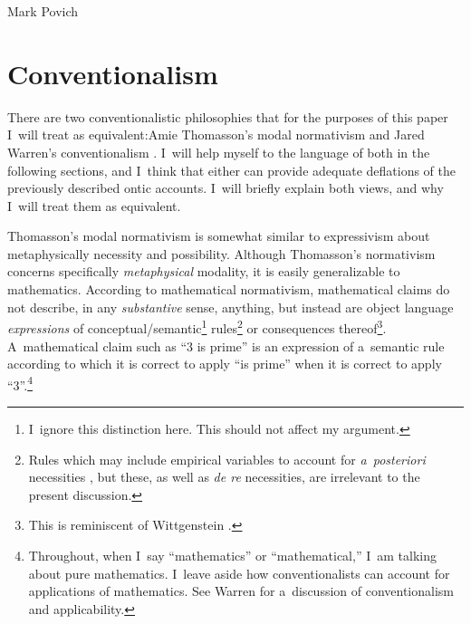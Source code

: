 \begin{artengenv}{Mark Povich}
\section{Conventionalism}
There are two conventionalistic philosophies that for the purposes of this paper I~will treat as equivalent:Amie Thomasson's
\parencites*[][]{thomasson_norms_2020}[][]{priest_note_2021} %
 modal normativism and Jared Warren's 
\parencite*[][]{simpson_creeping_2020} %
 conventionalism 
\parencites[see also][]{kocurek_against_2020}[][]{sidelle_necessity_1989}. %
 I~will help myself to the language of both in the following sections, and I~think that either can provide adequate deflations of the previously described ontic accounts. I~will briefly explain both views, and why I~will treat them as equivalent.

Thomasson's
\parencites*[][]{simpson_creeping_2020}[][]{priest_note_2021} %
 modal normativism is somewhat similar to expressivism about metaphysically necessity and possibility. Although Thomasson's normativism concerns specifically \textit{metaphysical} modality, it is easily generalizable to mathematics. According to mathematical normativism, mathematical claims do not describe, in any \textit{substantive} sense, anything, but instead are object language \textit{expressions} of conceptual/semantic\footnote{I~ignore this distinction here. This should not affect my argument.} rules\footnote{Rules which may include empirical variables to account for \textit{a~posteriori} necessities 
\parencites[][]{sidelle_necessity_1989}[][]{thomasson_norms_2020}[][]{warren_priori_2022}, %
 but these, as well as \textit{de re} necessities, are irrelevant to the present discussion.} or consequences thereof\footnote{This is reminiscent of Wittgenstein 
\parencites*[][]{wittgenstein_remarks_1978}[][]{wittgenstein_tractatus_2013}.%
}. A~mathematical claim such as ``3 is prime'' is an expression of a~semantic rule according to which it is correct to apply ``is prime'' when it is correct to apply ``3''.\footnote{Throughout, when I~say ``mathematics'' or ``mathematical,'' I~am talking about pure mathematics. I~leave aside how conventionalists can account for applications of mathematics. See Warren 
\parencite*[][]{warren_shadows_2020} %
 for a~discussion of conventionalism and applicability.}


\end{artengenv}
